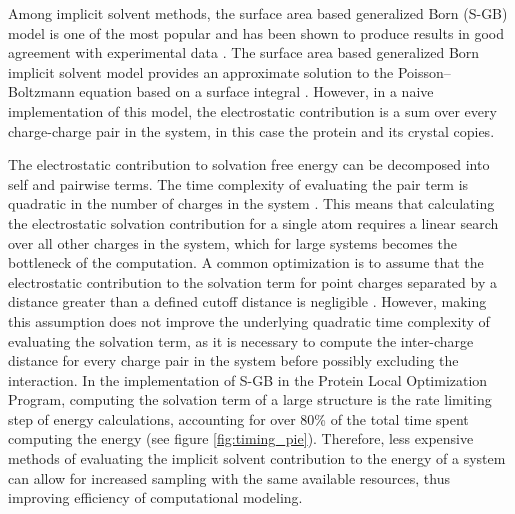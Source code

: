 Among implicit solvent methods, the surface area based generalized Born (S-GB) model is one of the most popular and has been shown to produce results in good agreement with experimental data \cite{zhang2001solvent,gallicchio2002sgb}.
The surface area based generalized Born implicit solvent model provides an approximate solution to the Poisson--Boltzmann equation based on a surface integral \cite{ghosh1998generalized}.
However, in a naive implementation of this model, the electrostatic contribution is a sum over every charge-charge pair in the system, in this case the protein and its crystal copies.

The electrostatic contribution to solvation free energy can be decomposed into self and pairwise terms.
The time complexity of evaluating the pair term is quadratic in the number of charges in the system \cite{ghosh1998generalized}.
This means that calculating the electrostatic solvation contribution for a single atom requires a linear search over all other charges in the system, which for large systems becomes the bottleneck of the computation.
A common optimization is to assume that the electrostatic contribution to the solvation term for point charges separated by a distance greater than a defined cutoff distance is negligible \cite{gallicchio2004agbnp}. 
However, making this assumption does not improve the underlying quadratic time complexity of evaluating the solvation term, as it is necessary to compute the inter-charge distance for every charge pair in the system before possibly excluding the interaction.
In the implementation of S-GB in the Protein Local Optimization Program, computing the solvation term of a large structure is the rate limiting step of energy calculations, accounting for over 80\% of the total time spent computing the energy (see figure \ref{fig:timing_pie}).
Therefore, less expensive methods of evaluating the implicit solvent contribution to the energy of a system can allow for increased sampling with the same available resources, thus improving efficiency of computational modeling. 

